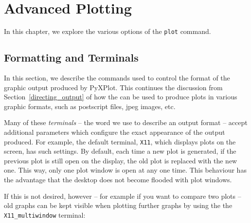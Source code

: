%
%
%
%
%



\chapter{Advanced Plotting}
\label{ch:plotting}

In this chapter, we explore the various options of the {\tt plot} command.

\section{Formatting and Terminals}
\label{set_terminal2}

In this section, we describe the commands used to control the format of the
graphic output produced by PyXPlot. This continues the discussion from
Section~\ref{directing_output} of how the  can be used to
produce plots in various graphic formats, such as postscript files, jpeg
images, etc.

Many of these {\it terminals} -- the word we use to describe an output format
-- accept additional parameters which configure the exact appearance of the
output produced.  For example, the default terminal, {\tt X11}, which displays
plots on the screen, has such settings. By default, each time a new plot is
generated, if the previous plot is still open on the display, the old plot is
replaced with the new one. This way, only one plot window is open at any one
time.  This behaviour has the advantage that the desktop does not become
flooded with plot windows.

If this is not desired, however -- for example if you want to compare two plots
-- old graphs can be kept visible when plotting further graphs by using the the
{\tt X11\_multiwindow} terminal:

